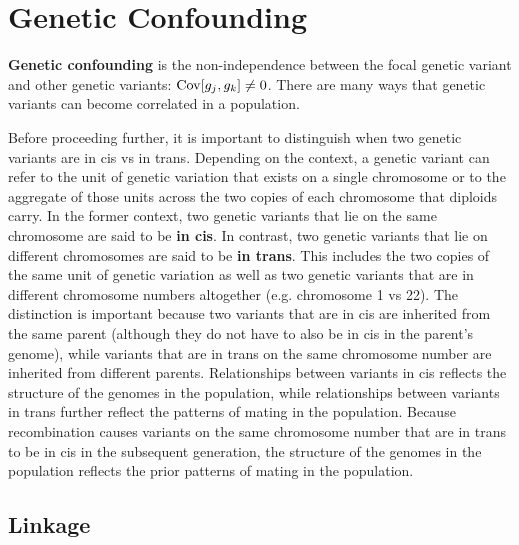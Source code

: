 \documentclass[12pt]{article}
\begin{document}
\section{Genetic Confounding}
\textbf{Genetic confounding} is the non-independence between the focal genetic variant and other genetic variants: $\mathrm{Cov}[g_j, g_k] \neq 0 $.
There are many ways that genetic variants can become correlated in a population.

Before proceeding further, it is important to distinguish when two genetic variants are in cis vs in trans.
Depending on the context, a genetic variant can refer to the unit of genetic variation that exists on a single chromosome or to the aggregate of those units across the two copies of each chromosome that diploids carry.
In the former context, two genetic variants that lie on the same chromosome are said to be \textbf{in cis}.
In contrast, two genetic variants that lie on different chromosomes are said to be \textbf{in trans}.
This includes the two copies of the same unit of genetic variation as well as two genetic variants that are in different chromosome numbers altogether (e.g. chromosome 1 vs 22).
The distinction is important because two variants that are in cis are inherited from the same parent (although they do not have to also be in cis in the parent's genome), while variants that are in trans on the same chromosome number are inherited from different parents.
Relationships between variants in cis reflects the structure of the genomes in the population, while relationships between variants in trans further reflect the patterns of mating in the population.
Because recombination causes variants on the same chromosome number that are in trans to be in cis in the subsequent generation, the structure of the genomes in the population reflects the prior patterns of mating in the population.

\subsection{Linkage}
\end{document}
